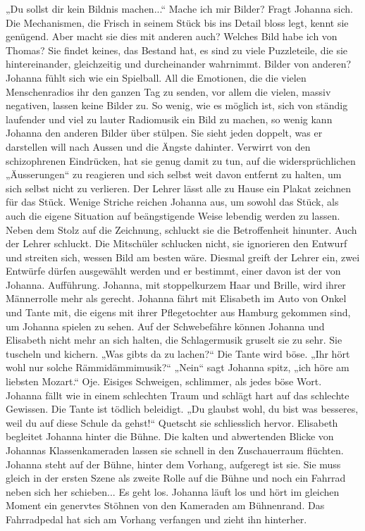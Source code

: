 „Du sollst dir kein Bildnis machen...“ Mache ich mir Bilder? Fragt Johanna sich. Die Mechanismen, die Frisch in seinem Stück bis ins Detail bloss legt, kennt sie genügend. Aber macht sie dies mit anderen auch? Welches Bild habe ich von Thomas? Sie findet keines, das Bestand hat, es sind zu viele Puzzleteile, die sie hintereinander, gleichzeitig und durcheinander wahrnimmt. Bilder von anderen? Johanna fühlt sich wie ein Spielball. All die Emotionen, die die vielen Menschenradios ihr den ganzen Tag zu senden, vor allem die vielen, massiv negativen, lassen keine Bilder zu. So wenig, wie es möglich ist, sich von ständig laufender und viel zu lauter Radiomusik ein Bild zu machen, so wenig kann Johanna den anderen Bilder über stülpen. Sie sieht jeden doppelt, was er darstellen will nach Aussen und die Ängste dahinter. 
Verwirrt von den schizophrenen Eindrücken, hat sie genug damit zu tun, auf die widersprüchlichen „Äusserungen“ zu reagieren und sich selbst weit davon entfernt zu halten, um sich selbst nicht zu verlieren.
Der Lehrer lässt alle zu Hause ein Plakat zeichnen für das Stück. Wenige Striche reichen Johanna aus, um sowohl das Stück, als auch die eigene Situation auf beängstigende Weise lebendig werden zu lassen. Neben dem Stolz auf die Zeichnung, schluckt sie die Betroffenheit hinunter. Auch der Lehrer schluckt. Die Mitschüler schlucken nicht, sie ignorieren den Entwurf und streiten sich, wessen Bild am besten wäre. Diesmal greift der Lehrer ein, zwei Entwürfe dürfen ausgewählt werden und er bestimmt, einer davon ist der von Johanna.
Aufführung. Johanna, mit stoppelkurzem Haar und Brille, wird ihrer Männerrolle mehr als gerecht. 
Johanna fährt mit Elisabeth im Auto von Onkel und Tante mit, die eigens mit ihrer Pflegetochter aus Hamburg gekommen sind, um Johanna spielen zu sehen. 
Auf der Schwebefähre können Johanna und Elisabeth nicht mehr an sich halten, die Schlagermusik gruselt sie zu sehr. Sie tuscheln und kichern. 
„Was gibts da zu lachen?“ Die Tante wird böse. „Ihr hört wohl nur solche Rämmidämmimusik?“ „Nein“ sagt Johanna spitz, „ich höre am liebsten Mozart.“ Oje. Eisiges Schweigen, schlimmer, als jedes böse Wort. Johanna fällt wie in einem schlechten Traum und schlägt hart auf das schlechte Gewissen. Die Tante ist tödlich beleidigt. „Du glaubst wohl, du bist was besseres, weil du auf diese Schule da gehst!“ Quetscht sie schliesslich hervor. 
Elisabeth begleitet Johanna hinter die Bühne. Die kalten und abwertenden Blicke von Johannas Klassenkameraden lassen sie schnell in den Zuschauerraum flüchten. 
Johanna steht auf der Bühne, hinter dem Vorhang, aufgeregt ist sie. Sie muss gleich in der ersten Szene als zweite Rolle auf die Bühne und noch ein Fahrrad neben sich her schieben... Es geht los. Johanna läuft los und hört im gleichen Moment ein genervtes Stöhnen von den Kameraden am Bühnenrand. Das Fahrradpedal hat sich am Vorhang verfangen und zieht ihn hinterher. 
